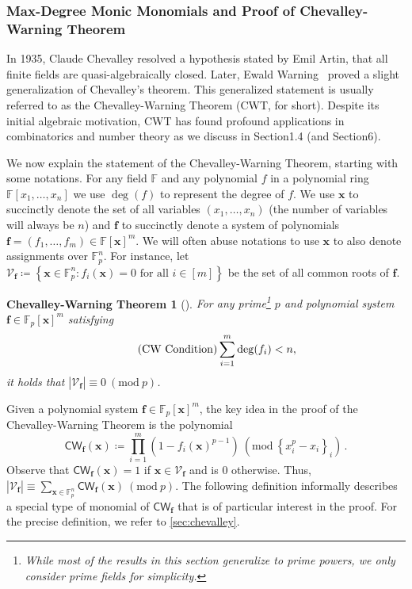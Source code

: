 \documentclass[10pt,a4paper]{article}
\theoremstyle{definition}
\theoremstyle{remark}
\let\boldm\bm
\newcommand{\inparen}[1]{\left ( #1 \right )}
\renewcommand{\mod}[1]{~\inparen{\mathrm{mod}~#1}}
\newcommand{\bx}{{\boldm x}}
\def\set#1{\left\{#1\right\}}
\newcommand{\bbF}{\ensuremath{\mathbb{F}}}
\newcommand{\calV}{\mathcal{V}}
\newcommand{\vecf}{\ensuremath{\boldsymbol{f}}}
\newcommand{\vecx}{\ensuremath{\boldsymbol{x}}}
\newcommand{\CWT}{CWT\xspace}
\newcommand{\CW}{\mathsf{CW}}
\begin{document}
\subsubsection{Max-Degree Monic Monomials and Proof of Chevalley-Warning Theorem} \label{sec:maximum-degree}

  In 1935, Claude Chevalley \cite{r15} resolved a
hypothesis stated by Emil Artin, that all finite fields are quasi-algebraically
closed. Later, Ewald Warning~\cite{r37}
proved a slight generalization of Chevalley's theorem. This
generalized statement is usually referred to as the Chevalley-Warning Theorem
(\CWT, for short). Despite its initial algebraic motivation, \CWT has found
profound applications in combinatorics and number theory as we discuss in
Section1.4 (and Section6).

We now explain the statement of the Chevalley-Warning Theorem, starting with some notations. For any field $\bbF$ and any polynomial $f$ in a polynomial ring $\bbF[x_1, \ldots, x_n]$ we use $\deg(f)$ to represent the degree of $f$. We use $\vecx$ to succinctly denote the set of all variables $(x_1, \ldots, x_n)$ (the number of variables will always be $n$) and $\vecf$ to succinctly denote a system of polynomials $\vecf = (f_1, \ldots, f_m) \in \bbF[\vecx]^m$. We will often abuse notations to use $\bx$ to also denote assignments over $\bbF_p^n$. For instance, let $\calV_{\vecf} \coloneqq \set{\bx \in \bbF_p^n : f_i(\bx) = 0 \text{ for all } i \in [m]}$ be the set of all common roots of $\vecf$.

\theoremstyle{plain}
\newtheorem*{cwthm}{Chevalley-Warning Theorem}
\begin{cwthm}[\cite{r15,r37}]
For any prime\footnote{While most of the results in this section
generalize to prime powers, we only consider prime fields for simplicity.} $p$ and polynomial system
$\vecf \in \bbF_p[\vecx]^m$ satisfying\vspace{-3.5mm}
\begin{equation}
\tag{CW Condition}
\sum_{i = 1}^m \deg(f_i) < n,\vspace*{-3mm}
\label{eq:CWcondition}
\end{equation}
it holds that $|\calV_{\vecf}| \equiv 0 \mod{p}$.
\end{cwthm}

\noindent Given a polynomial system $\vecf \in \bbF_p[\vecx]^m$,
the key idea in the proof of the Chevalley-Warning Theorem is the polynomial
\[ \CW_{\vecf}(\bx) \coloneqq \prod_{i = 1}^m \inparen{1 - f_i(\vecx)^{p - 1}} \mod{\set{x_i^p - x_i}_i}\,. \] Observe that $\CW_{\vecf}(\vecx) = 1$ if $\vecx \in \calV_{\vecf}$ and is $0$ otherwise. Thus, $|\calV_{\vecf}| \equiv \sum_{\vecx \in \bbF_p^n} \CW_{\vecf}(\bx) \mod{p}$.
The following definition informally describes a special type of monomial of
$\CW_{\vecf}$ that is of particular interest in the proof. For the precise definition, we
refer to \autoref{sec:chevalley}.
\end{document}
